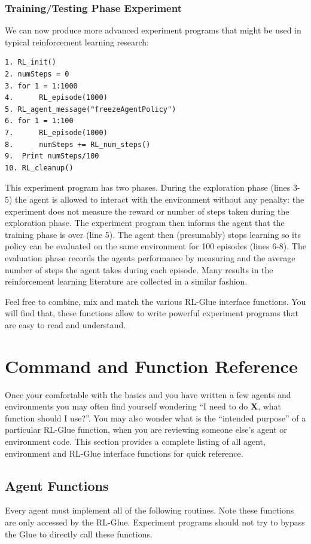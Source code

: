 \documentclass[11pt]{article}
\begin{document}
\subsubsection{Training/Testing Phase Experiment}
We can now produce more advanced experiment programs that might be used in typical reinforcement learning research:
\begin{verbatim}
1. RL_init()
2. numSteps = 0
3. for 1 = 1:1000
4.      RL_episode(1000)
5. RL_agent_message("freezeAgentPolicy")
6. for 1 = 1:100
7.      RL_episode(1000)
8.      numSteps += RL_num_steps()
9.  Print numSteps/100
10. RL_cleanup()
\end{verbatim}

This experiment program has two phases. During the exploration phase (lines 3-5) the agent is allowed to interact with the environment without any penalty: the experiment does not measure the reward or number of steps taken during the exploration phase. The experiment program then informs the agent that the training phase is over (line 5). The agent then (presumably) stops learning so its policy can be evaluated on the same environment for 100 episodes (lines 6-8). The evaluation phase records the agents performance by measuring and  the average number of steps the agent takes during each episode. Many results in the reinforcement learning literature are collected in a similar fashion.

Feel free to combine, mix and match the various RL-Glue interface functions. You will find that, these functions allow to write powerful experiment programs that are easy to read and understand. 


\section{Command and Function Reference}
\label{ref}
Once your comfortable with the basics and you have written a few agents and environments you may often find yourself wondering ``I need to do {\bf X}, what function should I use?''. You may also wonder what is the ``intended purpose'' of a particular RL-Glue function, when you are reviewing someone else's agent or environment code. This section provides a complete listing of all agent, environment and RL-Glue interface functions for quick reference.
\subsection{Agent Functions}
 
Every agent must implement all of the following routines. Note these functions are only accessed by the RL-Glue. Experiment programs should not try to bypass the Glue to directly call these functions.
\end{document}
